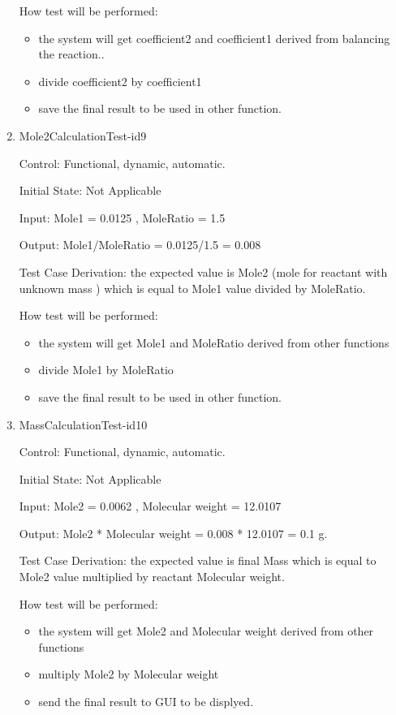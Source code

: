 \documentclass[12pt, titlepage]{article}
\begin{document}
\begin{enumerate}
How test will be performed: 
\begin{itemize}
\item the system will get coefficient2 and coefficient1 derived from balancing the reaction..
\item divide coefficient2 by coefficient1  
\item save the final result to be used in other function.
\end{itemize}

\item{Mole2CalculationTest-id9\\}

Control: Functional, dynamic, automatic.
					
Initial State: Not Applicable
					
Input: Mole1 = 0.0125  , MoleRatio = 1.5
			
Output:  Mole1/MoleRatio = 0.0125/1.5 =  0.008

Test Case Derivation: the expected value is Mole2 (mole for reactant with unknown mass ) which is equal to Mole1 value divided by MoleRatio.  				
	
How test will be performed: 
\begin{itemize}
\item the system will get Mole1 and MoleRatio derived from other functions
\item divide Mole1 by MoleRatio  
\item save the final result to be used in other function.
\end{itemize}

\item{MassCalculationTest-id10\\}

Control: Functional, dynamic, automatic.
					
Initial State: Not Applicable
					
Input: Mole2 = 0.0062  , Molecular weight = 12.0107
			
Output:  Mole2 * Molecular weight = 0.008 * 12.0107 = 0.1 g.

Test Case Derivation: the expected value is final Mass which is equal to Mole2 value multiplied by reactant Molecular weight.  				

How test will be performed: 
\begin{itemize}
\item the system will get Mole2 and Molecular weight derived from other functions
\item multiply Mole2 by Molecular weight  
\item send the final result to GUI to be displyed.
\end{itemize}

\end{enumerate}		
	
\end{document}
